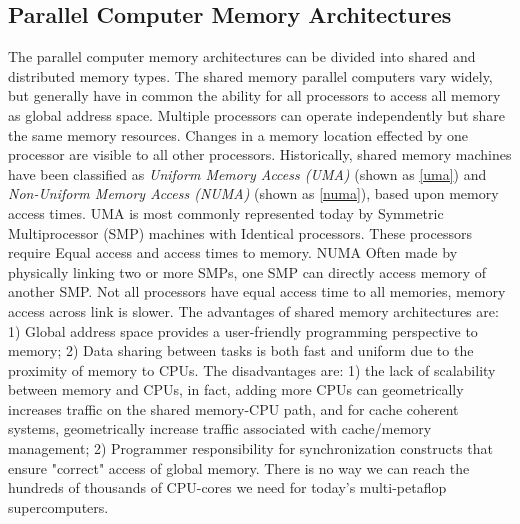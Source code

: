 \subsection{Parallel Computer Memory Architectures}

The parallel computer memory architectures can be divided into shared and distributed memory types. The shared memory parallel computers vary widely, but generally have in common the ability for all processors to access all memory as global address space. Multiple processors can operate independently but share the same memory resources. Changes in a memory location effected by one processor are visible to all other processors. Historically, shared memory machines have been classified as \textit{Uniform Memory Access (UMA)} (shown as \ref{uma}) and \textit{Non-Uniform Memory Access (NUMA)} (shown as \ref{numa}), based upon memory access times. UMA is most commonly represented today by Symmetric Multiprocessor (SMP) machines with Identical processors. These processors require Equal access and access times to memory. NUMA Often made by physically linking two or more SMPs, one SMP can directly access memory of another SMP. Not all processors have equal access time to all memories, memory access across link is slower. The advantages of shared memory architectures are: 1) Global address space provides a user-friendly programming perspective to memory; 2) Data sharing between tasks is both fast and uniform due to the proximity of memory to CPUs. The disadvantages are: 1) the lack of scalability between memory and CPUs, in fact, adding more CPUs can geometrically increases traffic on the shared memory-CPU path, and for cache coherent systems, geometrically increase traffic associated with cache/memory management; 2) Programmer responsibility for synchronization constructs that ensure "correct" access of global memory. There is no way we can reach the hundreds of thousands of CPU-cores we need for today’s multi-petaflop supercomputers.

